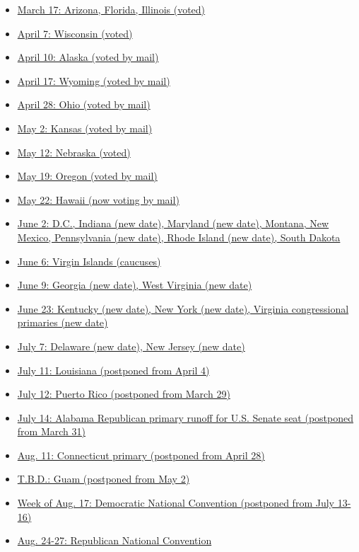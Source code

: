 \begin{itemize}
\tightlist
\item
  \protect\hyperlink{link-54e5a12a}{March 17: Arizona, Florida, Illinois
  (voted)}
\item
  \protect\hyperlink{link-53d2eb6b}{April 7: Wisconsin (voted)}
\item
  \protect\hyperlink{link-611af931}{April 10: Alaska (voted by mail)}
\item
  \protect\hyperlink{link-27600fb1}{April 17: Wyoming (voted by mail)}
\item
  \protect\hyperlink{link-35cbf62}{April 28: Ohio (voted by mail)}
\item
  \protect\hyperlink{link-7ae4eb1f}{May 2: Kansas (voted by mail)}
\item
  \protect\hyperlink{link-6ccca692}{May 12: Nebraska (voted)}
\item
  \protect\hyperlink{link-12c4f77c}{May 19: Oregon (voted by mail)}
\item
  \protect\hyperlink{link-29810690}{May 22: Hawaii (now voting by mail)}
\item
  \protect\hyperlink{link-4b49a960}{June 2: D.C., Indiana (new date),
  Maryland (new date), Montana, New Mexico, Pennsylvania (new date),
  Rhode Island (new date), South Dakota}
\item
  \protect\hyperlink{link-47225d41}{June 6: Virgin Islands (caucuses)}
\item
  \protect\hyperlink{link-4b1438e3}{June 9: Georgia (new date), West
  Virginia (new date)}
\item
  \protect\hyperlink{link-28cf57c0}{June 23: Kentucky (new date), New
  York (new date), Virginia congressional primaries (new date)}
\item
  \protect\hyperlink{link-62106c5c}{July 7: Delaware (new date), New
  Jersey (new date)}
\item
  \protect\hyperlink{link-5ded54e1}{July 11: Louisiana (postponed from
  April 4)}
\item
  \protect\hyperlink{link-6b280e85}{July 12: Puerto Rico (postponed from
  March 29)}
\item
  \protect\hyperlink{link-3565fd4e}{July 14: Alabama Republican primary
  runoff for U.S. Senate seat (postponed from March 31)}
\item
  \protect\hyperlink{link-41fbae3b}{Aug. 11: Connecticut primary
  (postponed from April 28)}
\item
  \protect\hyperlink{link-4c95eb7}{T.B.D.: Guam (postponed from May 2)}
\item
  \protect\hyperlink{link-35e4b0be}{Week of Aug. 17: Democratic National
  Convention (postponed from July 13-16)}
\item
  \protect\hyperlink{link-2c279805}{Aug. 24-27: Republican National
  Convention}
\end{itemize}

